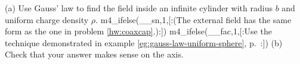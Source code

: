 (a) Use Gauss' law to find the field inside an
        infinite cylinder with radius $b$ and uniform
        charge density $\rho$. 
m4_ifelse(__sn,1,[:(The external field has the same form as
        the one in problem \ref{hw:coaxcap}.):])%
m4_ifelse(__fac,1,[:Use the technique demonstrated in example \ref{eg:gauss-law-uniform-sphere},
        p.~\pageref{eg:gauss-law-uniform-sphere}:])%
\answercheck\hwendpart
(b) Check that your answer makes sense on the axis.

